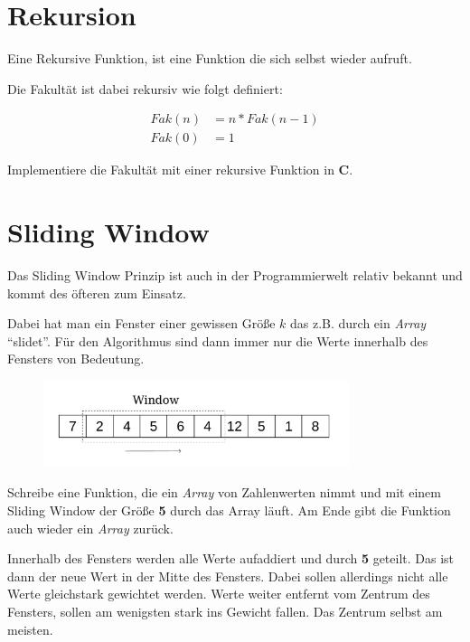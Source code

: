 \documentclass[c_worksheet.tex]{subfiles}
\begin{document}
\section{Rekursion} 


Eine Rekursive Funktion, ist eine Funktion die sich selbst wieder aufruft.

Die Fakultät ist dabei rekursiv wie folgt definiert:

\begin{align*}
	Fak(n) &= n * Fak(n-1) \\
	Fak(0) &= 1
\end{align*}

Implementiere die Fakultät mit einer rekursive Funktion in \textbf{C}.



\section{Sliding Window} 

Das Sliding Window Prinzip ist auch in der Programmierwelt relativ bekannt und kommt des öfteren zum Einsatz.

Dabei hat man ein Fenster einer gewissen Größe \(k\) das z.B. durch ein \emph{Array} ``slidet''. Für den Algorithmus sind dann immer nur die Werte innerhalb des Fensters von Bedeutung.

\begin{figure}[h]
\center
\includegraphics[width=0.8\textwidth]{Grafiken/FortgeschritteneAufgaben/slidingWindow} 
\end{figure}

Schreibe eine Funktion, die ein \emph{Array} von Zahlenwerten nimmt und mit einem Sliding Window der Größe \textbf{5} durch das Array läuft. Am Ende gibt die Funktion auch wieder ein \emph{Array} zurück.

Innerhalb des Fensters werden alle Werte aufaddiert und durch \textbf{5} geteilt. Das ist dann der neue Wert in der Mitte des Fensters. Dabei sollen allerdings nicht alle Werte gleichstark gewichtet werden. Werte weiter entfernt vom Zentrum des Fensters, sollen am wenigsten stark ins Gewicht fallen. Das Zentrum selbst am meisten.\\
\end{document}
